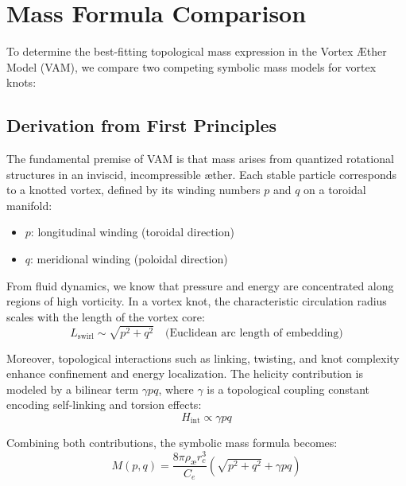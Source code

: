 \documentclass[11pt]{article}
\begin{document}
    \section{Mass Formula Comparison}
    To determine the best-fitting topological mass expression in the Vortex Æther Model (VAM), we compare two competing symbolic mass models for vortex knots:

    \subsection{Derivation from First Principles}
    The fundamental premise of VAM is that mass arises from quantized rotational structures in an inviscid, incompressible æther. Each stable particle corresponds to a knotted vortex, defined by its winding numbers \(p\) and \(q\) on a toroidal manifold:
    \begin{itemize}
        \item \(p\): longitudinal winding (toroidal direction)
        \item \(q\): meridional winding (poloidal direction)
    \end{itemize}

    From fluid dynamics, we know that pressure and energy are concentrated along regions of high vorticity. In a vortex knot, the characteristic circulation radius scales with the length of the vortex core:
    \begin{equation}
        L_{\text{swirl}} \sim \sqrt{p^2 + q^2} \quad \text{(Euclidean arc length of embedding)}
    \end{equation}

    Moreover, topological interactions such as linking, twisting, and knot complexity enhance confinement and energy localization. The helicity contribution is modeled by a bilinear term \(\gamma p q\), where \(\gamma\) is a topological coupling constant encoding self-linking and torsion effects:
    \begin{equation}
        H_{\text{int}} \propto \gamma p q
    \end{equation}

    Combining both contributions, the symbolic mass formula becomes:
    \begin{equation}
        M(p,q) = \frac{8\pi \rho_{\text{\ae}} r_c^3}{C_e} \left( \sqrt{p^2 + q^2} + \gamma p q \right)
    \end{equation}
\end{document}
